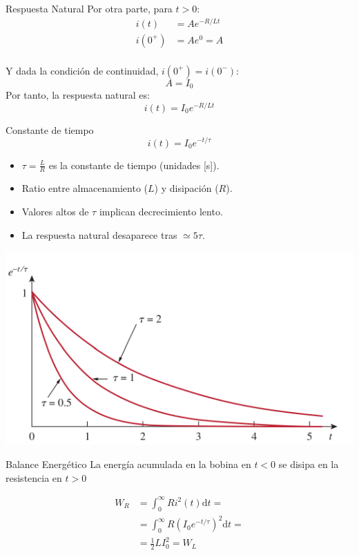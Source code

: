 \documentclass[aspectratio=169, xcolor={usenames,svgnames,dvipsnames}]{beamer}
\begin{document}
\begin{frame}[label={sec:org2fc2e1d}]{Respuesta Natural}
Por otra parte, para \(t > 0\):
\begin{align*}
  i(t) &= A e^{-R/L t}\\
  i(0^+) &= A e^0 = A\\
\end{align*}

Y dada la condición de continuidad, \(i(0^+) = i(0^-)\):
\[
  A = I_0
\]
Por tanto, la respuesta natural es:
\[
  \boxed{i(t) = I_0 e^{-R/L t}}
\]
\end{frame}



\begin{frame}[label={sec:orga53f77b}]{Constante de tiempo}
\[
  \boxed{i(t) = I_0 e^{-t/\tau}}
\]

\begin{itemize}
\item \(\tau = \frac{L}{R}\) es la constante de tiempo (unidades [s]).
\item Ratio entre almacenamiento (\(L\)) y disipación (\(R\)).
\item Valores altos de \(\tau\) implican decrecimiento lento.
\item La respuesta natural \guillemotleft{}desaparece\guillemotright{} tras \(\simeq 5\tau\).
\end{itemize}
\begin{center}
\includegraphics[height=0.5\textheight]{figs/constante_tiempo.pdf}
\end{center}
\end{frame}

\begin{frame}[label={sec:orgf9955a5}]{Balance Energético}
La energía acumulada en la bobina en \(t < 0\) se disipa en la resistencia en \(t > 0\)

\begin{align*}
  W_R &= \int_0^\infty R i^2(t)  \mathrm{d}t =\\
  &= \int_0^\infty R (I_0 e^{-t/\tau})^2  \mathrm{d}t = \\
  &= \frac{1}{2} L I_0^2 = W_L  
\end{align*}
\end{frame}
\end{document}
